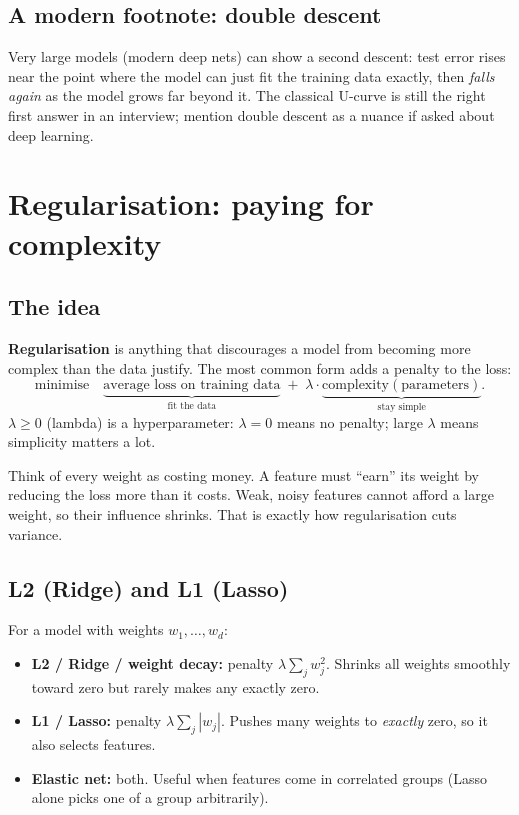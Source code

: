 \subsection{A modern footnote: double descent}
Very large models (modern deep nets) can show a second descent: test error rises near the point where the
model can just fit the training data exactly, then \emph{falls again} as the model grows far beyond it. The
classical U-curve is still the right first answer in an interview; mention double descent as a nuance if
asked about deep learning.

\section{Regularisation: paying for complexity}

\subsection{The idea}
\textbf{Regularisation} is anything that discourages a model from becoming more complex than the data
justify. The most common form adds a penalty to the loss:
\[
\text{minimise}\quad \underbrace{\text{average loss on training data}}_{\text{fit the data}}
\;+\; \lambda \cdot \underbrace{\text{complexity}(\text{parameters})}_{\text{stay simple}}.
\]
$\lambda \ge 0$ (lambda) is a hyperparameter: $\lambda = 0$ means no penalty; large $\lambda$ means simplicity
matters a lot.

\begin{intuition}
Think of every weight as costing money. A feature must ``earn'' its weight by reducing the loss more than it
costs. Weak, noisy features cannot afford a large weight, so their influence shrinks. That is exactly how
regularisation cuts variance.
\end{intuition}

\subsection{L2 (Ridge) and L1 (Lasso)}
For a model with weights $w_1,\dots,w_d$:
\begin{itemize}
\item \textbf{L2 / Ridge / weight decay:} penalty $\lambda \sum_j w_j^2$. Shrinks all weights smoothly toward
  zero but rarely makes any exactly zero.
\item \textbf{L1 / Lasso:} penalty $\lambda \sum_j |w_j|$. Pushes many weights to \emph{exactly} zero, so it
  also selects features.
\item \textbf{Elastic net:} both. Useful when features come in correlated groups (Lasso alone picks one of
  a group arbitrarily).
\end{itemize}

